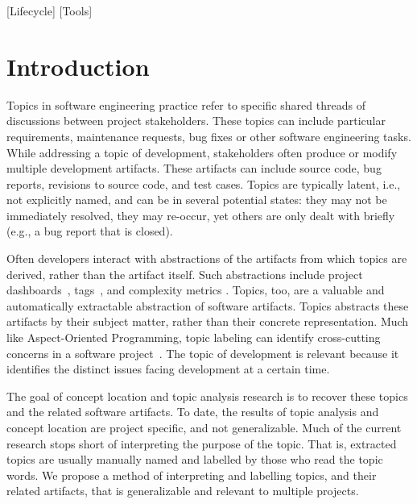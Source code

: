 \documentclass[]{sig-alternate}
\begin{document}
[Lifecycle]
[Tools]



\newcommand{\shrink}{}

\section{Introduction}
Topics in software engineering practice refer to specific shared threads of discussions between project stakeholders. 
These topics can include particular requirements, maintenance requests, bug fixes or other software engineering tasks. %
While addressing a topic of development, stakeholders often produce or modify multiple development artifacts.
%
These artifacts can include source code, bug reports, revisions to source code, and test cases. 
%
Topics are typically latent, i.e., not explicitly named, and can be in several potential states: they may not be immediately resolved, they may re-occur, yet others are only dealt with briefly  (e.g., a bug report that is closed).

Often developers interact with abstractions of the artifacts from which topics are derived, rather than the artifact itself. 
Such abstractions include project dashboards~\cite{kersten2005mylar}, tags~\cite{treude2010}, and complexity metrics \cite{mccabe1976complexity}. 
Topics, too, are a valuable and automatically extractable abstraction of software artifacts.
Topics abstracts these artifacts by their subject matter, rather than their concrete representation. 
Much like Aspect-Oriented Programming, topic labeling can identify cross-cutting concerns in a software project~\cite{Baldi2008}.
The topic of development is relevant because it identifies the distinct issues facing development at a certain time.

The goal of concept location and topic analysis research is to recover these topics and the related software artifacts.
To date, the results of topic analysis and concept location are project specific, and not generalizable.
Much of the current research stops short of interpreting the purpose of the topic. 
That is, extracted topics are usually manually named and labelled by those who read the topic words.
We propose a method of interpreting and labelling topics, and their related artifacts, that is generalizable and relevant to multiple projects.
\end{document}
